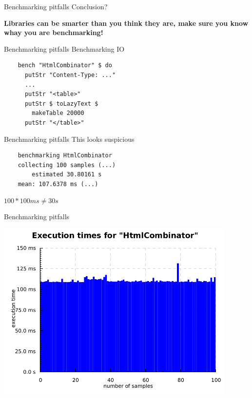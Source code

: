 \documentclass[20pt]{beamer}
\newcommand{\vspaced}{
    \vspace{5mm}
}
\begin{document}
\begin{frame}{Benchmarking pitfalls}
    Conclusion? \\
    \vspaced
    \textbf{Libraries can be smarter than you think they are, make sure you know
    whay you are benchmarking!}
\end{frame}

\begin{frame}[fragile]{Benchmarking pitfalls}
    Benchmarking IO \\
    \vspaced
    \begin{lstlisting}
    bench "HtmlCombinator" $ do
      putStr "Content-Type: ..."
      ...
      putStr "<table>"
      putStr $ toLazyText $
        makeTable 20000
      putStr "</table>"
    \end{lstlisting}
\end{frame}

\begin{frame}[fragile]{Benchmarking pitfalls}
    This looks suspicious \\
    \vspaced
    \begin{lstlisting}
    benchmarking HtmlCombinator
    collecting 100 samples (...)
        estimated 30.80161 s
    mean: 107.6378 ms (...)
    \end{lstlisting}
    \vspaced
    $100 * 100ms \neq 30s$
\end{frame}

\begin{frame}{Benchmarking pitfalls}
    \begin{center}
    \includegraphics[width=0.9\textwidth]{images/htmlcombinator.pdf}
    \end{center}
\end{frame}
\end{document}

